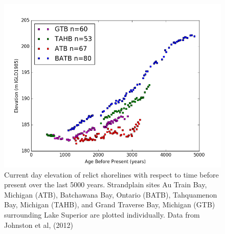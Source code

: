 \begin{figure}[h]
	\includegraphics[width=1.1\linewidth]{data/theDataRaw.png}
	\caption{Current day elevation of relict shorelines with respect to time before present over the last 5000 years. Strandplain sites Au Train Bay, Michigan (ATB), Batchawana Bay, Ontario (BATB), Tahquamenon Bay, Michigan (TAHB), and Grand Traverse Bay, Michigan (GTB) surrounding Lake Superior are plotted individually. Data from Johnston et al, (2012)}
	\label{fig:rawData}
\end{figure} 
%
